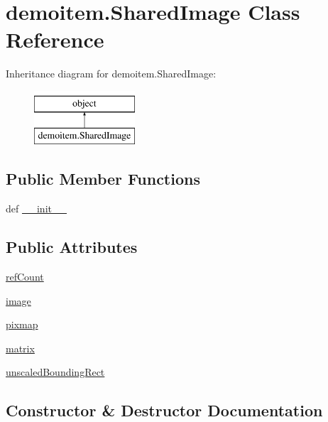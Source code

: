 \hypertarget{classdemoitem_1_1SharedImage}{}\section{demoitem.\+Shared\+Image Class Reference}
\label{classdemoitem_1_1SharedImage}
Inheritance diagram for demoitem.\+Shared\+Image\+:\begin{figure}[H]
\begin{center}
\leavevmode
\includegraphics[height=2.000000cm]{classdemoitem_1_1SharedImage}
\end{center}
\end{figure}
\subsection*{Public Member Functions}
\begin{DoxyCompactItemize}
\item 
def \hyperlink{classdemoitem_1_1SharedImage_af59d82aee8fb7e54b42020181c6d4ebb}{\+\_\+\+\_\+init\+\_\+\+\_\+}
\end{DoxyCompactItemize}
\subsection*{Public Attributes}
\begin{DoxyCompactItemize}
\item 
\hyperlink{classdemoitem_1_1SharedImage_a672a3edf4a975fe1fa8dd54910809818}{ref\+Count}
\item 
\hyperlink{classdemoitem_1_1SharedImage_a61c457e4dfed5eab350bbb32957e9f62}{image}
\item 
\hyperlink{classdemoitem_1_1SharedImage_a9c4fd75f403df967fbfd75379cdc8df7}{pixmap}
\item 
\hyperlink{classdemoitem_1_1SharedImage_a2eb283e2de37b6c05ca1fb5c25e0ebb5}{matrix}
\item 
\hyperlink{classdemoitem_1_1SharedImage_a8607cf563727f1eed4ce1f601b07ab83}{unscaled\+Bounding\+Rect}
\end{DoxyCompactItemize}


\subsection{Constructor \& Destructor Documentation}
\hypertarget{classdemoitem_1_1SharedImage_af59d82aee8fb7e54b42020181c6d4ebb}{}
